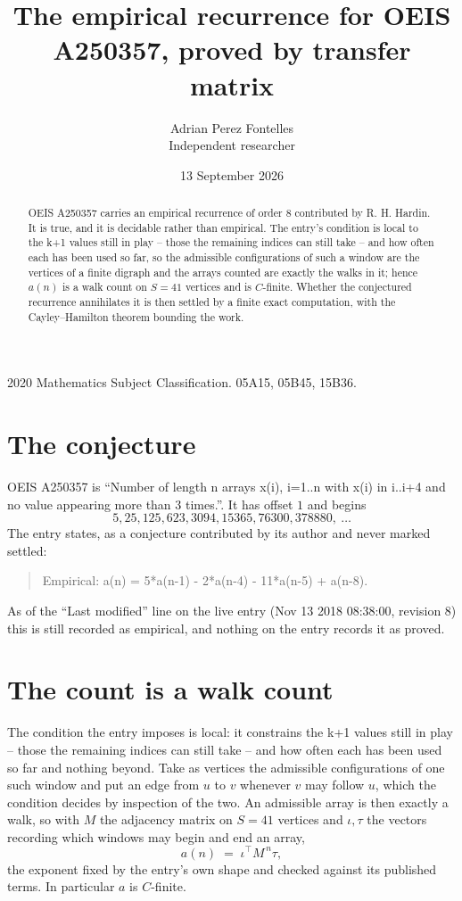 \documentclass[11pt,a4paper]{article}
\title{The empirical recurrence for OEIS A250357, proved by transfer matrix}
\author{Adrian Perez Fontelles\\ \small Independent researcher}
\date{13 September 2026}
\theoremstyle{plain}
\theoremstyle{definition}
\begin{document}
\maketitle

\begin{abstract}
OEIS A250357 carries an empirical recurrence of order $8$ contributed by R. H. Hardin. It is
true, and it is decidable rather than empirical. The entry's condition is local to the k+1 values still in play -- those the remaining indices can still take -- and how often each has been used so far, so
the admissible configurations of such a window are the vertices of a finite digraph and the
arrays counted are exactly the walks in it; hence $a(n)$ is a walk count on $S=41$ vertices
and is $C$-finite. Whether the conjectured recurrence annihilates it is then settled by a
finite exact computation, with the Cayley--Hamilton theorem bounding the work.
\end{abstract}

\noindent\small 2020 Mathematics Subject Classification. 05A15, 05B45, 15B36.\normalsize

\section{The conjecture}

OEIS A250357 is ``Number of length n arrays x(i), i=1..n with x(i) in i..i+4 and no value appearing more than 3 times.''. It has offset $1$ and begins
\[
5, 25, 125, 623, 3094, 15365, 76300, 378880,\ \dots
\]
The entry states, as a conjecture contributed by its author and never marked settled:
\begin{quote}
Empirical: a(n) = 5*a(n-1) - 2*a(n-4) - 11*a(n-5) + a(n-8).
\end{quote}
As of the ``Last modified'' line on the live entry (Nov 13 2018 08:38:00, revision 8) this is still
recorded as empirical, and nothing on the entry records it as proved.

\section{The count is a walk count}

The condition the entry imposes is local: it constrains the k+1 values still in play -- those the remaining indices can still take -- and how often each has been used so far and nothing beyond. Take as
vertices the admissible configurations of one such window and put an edge from $u$ to $v$
whenever $v$ may follow $u$, which the condition decides by inspection of the two. An
admissible array is then exactly a walk, so with $M$ the adjacency matrix on $S=41$ vertices
and $\iota,\tau$ the vectors recording which windows may begin and end an array,
\[
a(n)\;=\;\iota^{\!\top}M^{\,n}\tau ,
\]
the exponent fixed by the entry's own shape and checked against its published terms. In
particular $a$ is $C$-finite.
\end{document}

